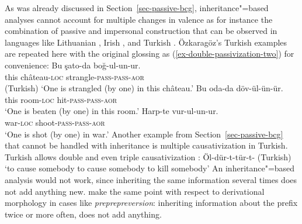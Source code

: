 \begin{exe}
\begin{xlist}[iv.]
\begin{exe}
\begin{xlist}[iv.]
As was already discussed in Section~\ref{sec-passive-bcg}, inheritance"=based analyses cannot
account for multiple changes in valence as for instance the combination of passive and impersonal
construction that can be observed in languages like Lithuanian
\citep[Section~5]{Timberlake82a}, Irish \citep{Noonan94a}, and Turkish
\citep{Ozkaragoez86a}. Özkaragöz's Turkish examples are repeated here with the original glossing as
(\ref{ex-double-passivization-two}) for convenience:
\eal\label{ex-double-passivization-two}
\ex\label{ex-double-passivization-strangle-two}
\gll Bu şato-da boğ-ul-un-ur.\\
     this château-\textsc{loc} strangle-\textsc{pass}-\textsc{pass}-\textsc{aor}\\\hfill(Turkish)
\glt `One is strangled (by one) in this château.'
\ex\label{ex-double-passivization-hit-two}
\gll Bu oda-da döv-ül-ün-ür.\\
     this room-\textsc{loc} hit-\textsc{pass}-\textsc{pass}-\textsc{aor}\\
\glt `One is beaten (by one) in this room.'
\ex
\gll Harp-te vur-ul-un-ur.\\
     war-\textsc{loc} shoot-\textsc{pass}-\textsc{pass}-\textsc{aor}\\
\glt `One is shot (by one) in war.'
\zl
Another example from Section~\ref{sec-passive-bcg} that cannot be handled with inheritance is multiple causativization in
Turkish. Turkish allows double and even triple causativization \citep[]{Lewis67a-u}: 
\ea
Öl-dür-t-tür-t- \hfill(Turkish)\\
`to cause somebody to cause somebody to kill somebody' 
\z 
An inheritance"=based analysis would not work, since inheriting the same information several times
does not add anything new. \citet{KN93a} make the same point with respect to derivational morphology
in cases like \emph{preprepreversion}: inheriting information about the prefix  twice or
more often, does not add anything.


\end{xlist}
\end{exe}
\end{xlist}
\end{exe}
